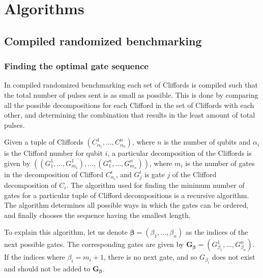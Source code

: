 \chapter{Algorithms}
  \section{Compiled randomized benchmarking}
    \label{sec:compiled randomized benchmarking algorithm}
    \subsection{Finding the optimal gate sequence}
      In compiled randomized benchmarking each set of Cliffords is compiled such that the total number of pulses sent is as small as possible. This is done by comparing all the possible decompositions for each Clifford in the set of Cliffords with each other, and determining the combination that results in the least amount of total pulses.

      Given a tuple of Cliffords $\left(C_{\alpha_1}^1, \dots, C_{\alpha_n}^n\right)$, where $n$ is the number of qubits and $\alpha_i$ is the Clifford number for qubit $i$, a particular decomposition of the Cliffords is given by $\left(\left( G_1^1, ..., G_{m_1}^1 \right) , ..., \left(G_1^n, ..., G_{m_n}^n\right)\right)$, where $m_i$ is the number of gates in the decomposition of Clifford $C_{\alpha_i}^i$, and $G_j^i$ is gate $j$ of the Clifford decomposition of $C_i$. The algorithm used for finding the minimum number of gates for a particular tuple of Clifford decompositions is a recursive algorithm. The algorithm determines all possible ways in which the gates can be ordered, and finally chooses the sequence having the smallest length.

      To explain this algorithm, let us denote $\bm{\beta}=\left(\beta_1, \dots, \beta_n\right)$ as the indices of the next possible gates. The corresponding gates are given by $\bm{G_\bm{\beta}}=\left( G_{\beta_1}^1, \dots, G_{\beta_n}^n \right)$. If the indices where $\beta_i=m_i + 1$, there is no next gate, and so $G_{\beta_i}$ does not exist and should not be added to $\bm{G_\bm{\beta}}$.

